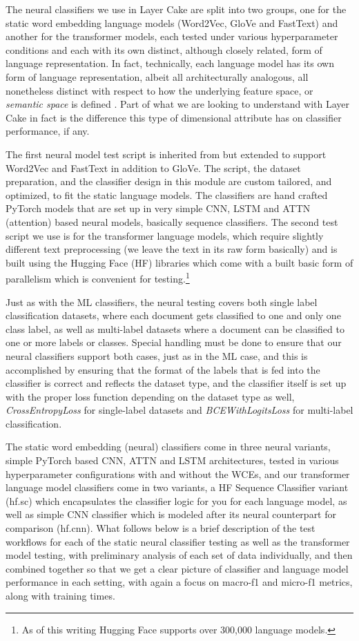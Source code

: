 \documentclass[final]{clv2025}
\begin{document}
The neural classifiers we use in Layer Cake are split into two groups, one for the static word embedding language models (Word2Vec, GloVe and FastText) and another for the transformer models, each tested under various hyperparameter conditions and each with its own distinct, although closely related, form of language representation. In fact, technically, each language model has its own form of language representation, albeit all architecturally analogous, all nonetheless distinct with respect to how the underlying feature space, or \textit{semantic space} is defined \cite{worth}. Part of what we are looking to understand with Layer Cake in fact is the difference this type of dimensional attribute has on classifier performance, if any.

The first neural model test script is inherited from \cite{moreo2021} but extended to support Word2Vec and FastText in addition to GloVe. The script, the dataset preparation, and the classifier design in this module are custom tailored, and optimized, to fit the static language models. The classifiers are hand crafted PyTorch models that are set up in very simple CNN, LSTM and ATTN (attention) based neural models, basically sequence classifiers. The second test script we use is for the transformer language models, which require slightly different text preprocessing (we leave the text in its raw form basically) and is built using the Hugging Face (HF) libraries which come with a built basic form of parallelism which is convenient for testing.\footnote{As of this writing Hugging Face supports over 300,000 language models.}  

Just as with the ML classifiers, the neural testing covers both single label classification datasets, where each document gets classified to one and only one class label, as well as multi-label datasets where a document can be classified to one or more labels or classes. Special handling must be done to ensure that our neural classifiers support both cases, just as in the ML case, and this is accomplished by ensuring that the format of the labels that is fed into the classifier is correct and reflects the dataset type, and the classifier itself is set up with the proper loss function depending on the dataset type as well, \textit{CrossEntropyLoss} for single-label datasets and \textit{BCEWithLogitsLoss} for multi-label classification.

The static word embedding (neural) classifiers come in three neural variants, simple PyTorch based CNN, ATTN and LSTM architectures, tested in various hyperparameter configurations with and without the WCEs, and our transformer language model classifiers come in two variants, a HF Sequence Classifier variant (hf.sc) which encapsulates the classifier logic for you for each language model, as well as simple CNN classifier which is modeled after its neural counterpart for comparison (hf.cnn). What follows below is a brief description of the test workflows for each of the static neural classifier testing as well as the transformer model testing, with preliminary analysis of each set of data individually, and then combined together so that we get a clear picture of classifier and language model performance in each setting, with again a focus on macro-f1 and micro-f1 metrics, along with training times. 
\end{document}
